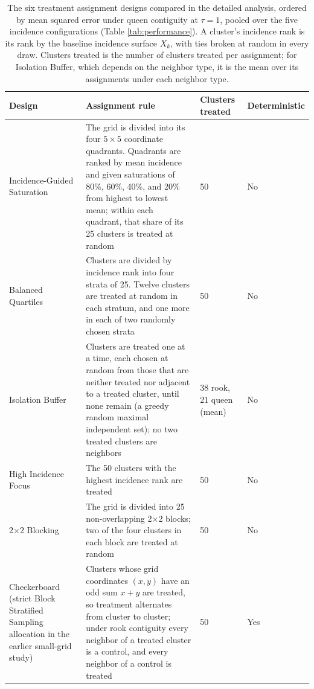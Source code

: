 \documentclass[11pt]{article}
\begin{document}
\begin{table}[!htb]

\small
\centering

\caption{The six treatment assignment designs compared in the detailed analysis, ordered by mean squared error under queen contiguity at $\tau = 1$, pooled over the five incidence configurations (Table \ref{tab:performance}). A cluster's incidence rank is its rank by the baseline incidence surface $X_k$, with ties broken at random in every draw. Clusters treated is the number of clusters treated per assignment; for Isolation Buffer, which depends on the neighbor type, it is the mean over its assignments under each neighbor type.}
\label{tab:designs}

\begin{tabular}{p{3.4cm}p{6.4cm}p{2.0cm}p{2.3cm}}

\toprule
Design & Assignment rule & Clusters treated & Deterministic \\

\midrule
Incidence-Guided Saturation & The grid is divided into its four $5\times5$ coordinate quadrants. Quadrants are ranked by mean incidence and given saturations of 80\%, 60\%, 40\%, and 20\% from highest to lowest mean; within each quadrant, that share of its 25 clusters is treated at random & 50 & No \\
Balanced Quartiles & Clusters are divided by incidence rank into four strata of 25. Twelve clusters are treated at random in each stratum, and one more in each of two randomly chosen strata & 50 & No \\
Isolation Buffer & Clusters are treated one at a time, each chosen at random from those that are neither treated nor adjacent to a treated cluster, until none remain (a greedy random maximal independent set); no two treated clusters are neighbors & \raggedright 38 rook, 21 queen (mean) & No \\
High Incidence Focus & The 50 clusters with the highest incidence rank are treated & 50 & No \\
2$\times$2 Blocking & The grid is divided into 25 non-overlapping 2$\times$2 blocks; two of the four clusters in each block are treated at random & 50 & No \\
Checkerboard (strict Block Stratified Sampling allocation in the earlier small-grid study) & Clusters whose grid coordinates $(x, y)$ have an odd sum $x + y$ are treated, so treatment alternates from cluster to cluster; under rook contiguity every neighbor of a treated cluster is a control, and every neighbor of a control is treated & 50 & Yes \\

\bottomrule

\end{tabular}

\end{table}
\end{document}
